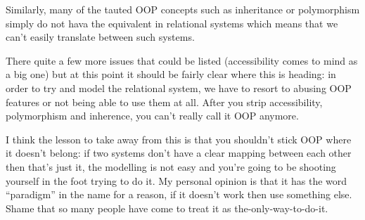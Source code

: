 \documentclass{report}
\begin{document}
Similarly, many of the tauted OOP concepts such as inheritance or
polymorphism simply do not hava the equivalent in relational systems
which means that we can't easily translate between such systems.

There quite a few more issues that could be listed (accessibility
comes to mind as a big one) but at this point it should be fairly
clear where this is heading: in order to try and model the relational
system, we have to resort to abusing OOP features or not being able to
use them at all. After you strip accessibility, polymorphism and
inherence, you can't really call it OOP anymore.

I think the lesson to take away from this is that you shouldn't stick
OOP where it doesn't belong: if two systems don't have a clear mapping
between each other then that's just it, the modelling is not easy and
you're going to be shooting yourself in the foot trying to do it. My
personal opinion is that it has the word ``paradigm'' in the name for
a reason, if it doesn't work then use something else. Shame that so
many people have come to treat it as the-only-way-to-do-it.
\end{document}
